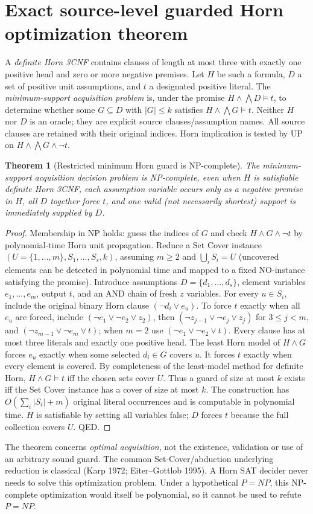 \documentclass[11pt]{article}
\newtheorem{theorem}{Theorem}
\begin{document}
\section{Exact source-level guarded Horn optimization theorem}
A \emph{definite Horn 3CNF} contains clauses of length at most three with exactly one positive head and zero or more negative premises. Let $H$ be such a formula, $D$ a set of positive unit assumptions, and $t$ a designated positive literal. The \emph{minimum-support acquisition problem} is, under the promise $H\wedge\bigwedge D\models t$, to determine whether some $G\subseteq D$ with $|G|\le k$ satisfies $H\wedge\bigwedge G\models t$. Neither $H$ nor $D$ is an oracle; they are explicit source clauses/assumption names. All source clauses are retained with their original indices. Horn implication is tested by UP on $H\wedge\bigwedge G\wedge\neg t$.
\begin{theorem}[Restricted minimum Horn guard is NP-complete]
The minimum-support acquisition decision problem is NP-complete, even when $H$ is satisfiable definite Horn 3CNF, each assumption variable occurs only as a negative premise in $H$, all $D$ together force $t$, and one valid (not necessarily shortest) support is immediately supplied by $D$.
\end{theorem}
\begin{proof}
Membership in NP holds: guess the indices of $G$ and check $H\land G\land\neg t$ by polynomial-time Horn unit propagation. Reduce a Set Cover instance $(U=\{1,\ldots,m\},S_1,\ldots,S_s,k)$, assuming $m\ge2$ and $\bigcup_i S_i=U$ (uncovered elements can be detected in polynomial time and mapped to a fixed NO-instance satisfying the promise). Introduce assumptions $D=\{d_1,\ldots,d_s\}$, element variables $e_1,\ldots,e_m$, output $t$, and an AND chain of fresh $z$ variables. For every $u\in S_i$, include the original binary Horn clause $(\neg d_i\vee e_u)$. To force $t$ exactly when all $e_u$ are forced, include $(\neg e_1\vee\neg e_2\vee z_2)$, then $(\neg z_{j-1}\vee\neg e_j\vee z_j)$ for $3\le j<m$, and $(\neg z_{m-1}\vee\neg e_m\vee t)$; when $m=2$ use $(\neg e_1\vee\neg e_2\vee t)$. Every clause has at most three literals and exactly one positive head. The least Horn model of $H\land G$ forces $e_u$ exactly when some selected $d_i\in G$ covers $u$. It forces $t$ exactly when every element is covered. By completeness of the least-model method for definite Horn, $H\land G\models t$ iff the chosen sets cover $U$. Thus a guard of size at most $k$ exists iff the Set Cover instance has a cover of size at most $k$. The construction has $O(\sum_i|S_i|+m)$ original literal occurrences and is computable in polynomial time. $H$ is satisfiable by setting all variables false; $D$ forces $t$ because the full collection covers $U$. QED.
\end{proof}
\noindent The theorem concerns \emph{optimal acquisition}, not the existence, validation or use of an arbitrary sound guard. The common Set-Cover/abduction underlying reduction is classical (Karp 1972; Eiter--Gottlob 1995). A Horn SAT decider never needs to solve this optimization problem. Under a hypothetical $P=NP$, this NP-complete optimization would itself be polynomial, so it cannot be used to refute $P=NP$.
\end{document}
